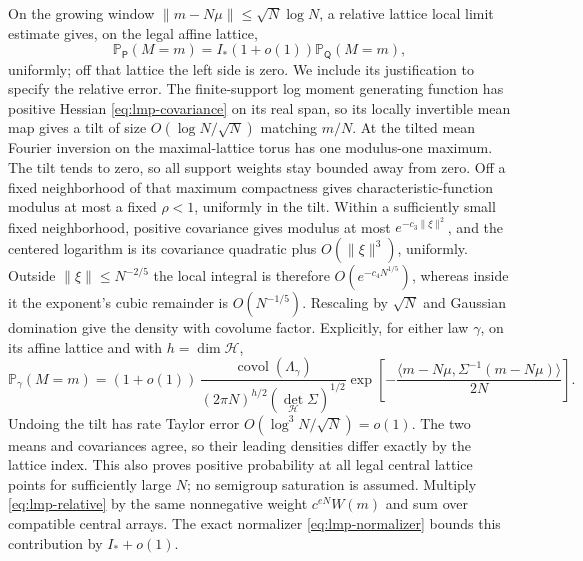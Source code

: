 On the growing window $\|m-N\mu\|\le\sqrt N\log N$, a relative
lattice local limit estimate gives, on the legal affine lattice,
\begin{equation}\label{eq:lmp-relative}
 \mathbb P_{\mathsf P}(M=m)
       =I_*(1+o(1))\mathbb P_{\mathsf Q}(M=m),
\end{equation}
uniformly; off that lattice the left side is zero. We include its
justification to specify the relative error. The finite-support log
moment generating function has positive Hessian \eqref{eq:lmp-covariance}
on its real span, so its locally invertible mean map gives a tilt of
size $O(\log N/\sqrt N)$ matching $m/N$. At the tilted mean Fourier
inversion on the maximal-lattice torus has one modulus-one maximum.
The tilt tends to zero, so all support weights stay bounded away
from zero. Off a fixed neighborhood of that maximum compactness
gives characteristic-function modulus at most a fixed $\rho<1$,
uniformly in the tilt. Within a sufficiently small fixed neighborhood,
positive covariance gives modulus at most $e^{-c_3\|\xi\|^2}$, and
the centered logarithm is its covariance quadratic plus
$O(\|\xi\|^3)$, uniformly. Outside $\|\xi\|\le N^{-2/5}$ the local
integral is therefore $O(e^{-c_4N^{1/5}})$, whereas inside it the
exponent's cubic remainder is $O(N^{-1/5})$. Rescaling by $\sqrt N$
and Gaussian domination give the density with covolume factor.
Explicitly, for either law $\gamma$,
on its affine lattice and with $h=\dim\mathcal H$,
\[
 \mathbb P_\gamma(M=m)=(1+o(1))\,
 \frac{\operatorname{covol}(\Lambda_\gamma)}
 {(2\pi N)^{h/2}(\det_{\mathcal H}\Sigma)^{1/2}}
 \exp\!\left[-\frac{\langle m-N\mu,\Sigma^{-1}(m-N\mu)\rangle}{2N}\right].
\]
Undoing the tilt has rate Taylor error
$O(\log^3N/\sqrt N)=o(1)$. The two means and covariances agree, so
their leading densities differ exactly by the lattice index. This
also proves positive probability at all legal central lattice points
for sufficiently large $N$; no semigroup saturation is assumed.
Multiply \eqref{eq:lmp-relative} by the same nonnegative weight
$c^{eN}W(m)$ and sum over compatible central arrays. The exact
normalizer \eqref{eq:lmp-normalizer} bounds this contribution by
$I_*+o(1)$.

